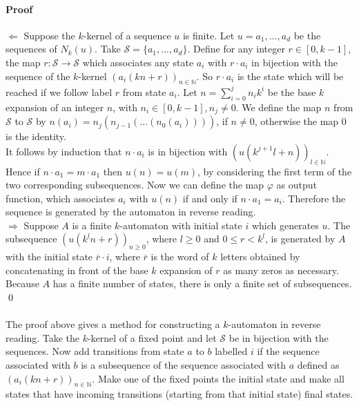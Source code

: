 \documentclass{article}
\begin{document}
\paragraph{Proof}
$\Leftarrow$ Suppose the $k$-kernel of a sequence $u$ is finite. Let
$u = a_1, ..., a_d$ be the sequences of $N_k(u)$. Take
$\mathcal{S} = \{a_1, ..., a_d\}$. Define for any integer $r \in [0, k - 1]$, 
the map $r : \mathcal{S} \rightarrow \mathcal{S}$ which associates any state 
$a_i$ with $r \cdot a_i$ in bijection with the sequence of the $k$-kernel
$(a_i(kn + r))_{n \in \mathbb{N}}$. So $r \cdot a_i$ is the state which will be
reached if we follow label $r$ from state $a_i$. Let
$n = \sum_{i = 0}^j n_i k^i$ be the base $k$ expansion of an integer $n$, with
$n_i \in [0, k - 1], n_j \ne 0$.  We define the map $n$ from
$\mathcal{S}$ to $\mathcal{S}$ by $n(a_i) = n_j(n_{j - 1}( ... (n_0(a_i))))$,
if $n \ne 0$, otherwise the map 0 is the identity.\\
It follows by induction that $n \cdot a_i$ is in bijection with
$(u(k^{j + 1} l + n))_{l \in \mathbb{N}}$. Hence if $n \cdot a_1 = m \cdot a_1$
then $u(n) = u(m)$, by considering the first term of the two corresponding
subsequences. Now we can define the map $\varphi$ as output function, which
associates $a_i$ with $u(n)$ if and only if $n \cdot a_1 = a_i$. Therefore the
sequence is generated by the automaton in reverse reading.\\
$\Rightarrow$ Suppose $A$ is a finite $k$-automaton with initial state $i$
which generates $u$. The subsequence $(u(k^ln + r))_{n \ge 0}$, where
$l \ge 0$ and $0 \le r < k^l$, is generated by $A$ with the initial state
$\overline{r} \cdot i$, where $\overline{r}$ is the word of $k$ letters
obtained by concatenating in front of the base $k$ expansion of $r$ as many
zeros as necessary. Because $A$ has a finite number of states, there is only a
finite set of subsequences. \qed\\
\\
The proof above gives a method for constructing a $k$-automaton in reverse
reading. Take the $k$-kernel of a fixed point and let $\mathcal{S}$ be in
bijection with the sequences. Now add transitions from state $a$ to $b$
labelled $i$ if the sequence associated with $b$ is a subsequence of the
sequence associated with $a$ defined as $(a_i(kn + r))_{n \in \mathbb{N}}$.
Make one of the fixed points the initial state and make all states that have
incoming transitions (starting from that initial state) final states.
\end{document}
